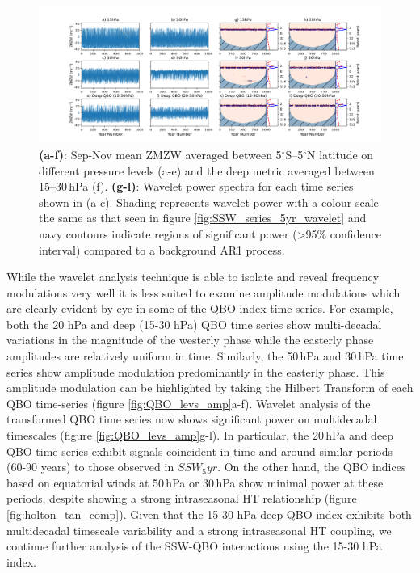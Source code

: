 \begin{center}
\begin{figure}[h!]
\noindent\includegraphics[width = \linewidth]{Figures/Figures-origins/QBO_levels.png}
\caption[QBO timeseries and associated wavelet power spectra at different levels in UKESM]{\textbf{(a-f)}: Sep-Nov mean ZMZW averaged between 5$^\circ$S--5$^\circ$N latitude on different pressure levels (a-e) and the deep metric averaged between 15--30\,hPa (f). \textbf{(g-l)}: Wavelet power spectra for each time series shown in (a-c). Shading represents wavelet power with a colour scale the same as that seen in figure \ref{fig:SSW_series_5yr_wavelet} and navy contours indicate regions of significant power (>95\% confidence interval) compared to a background AR1 process.}
\label{fig:QBO_levs}
\end{figure}
\end{center}


While the wavelet analysis technique is able to isolate and reveal frequency modulations very well it is less suited to examine amplitude modulations which are clearly evident by eye in some of the QBO index time-series. For example, both the 20 hPa and deep (15-30 hPa) QBO time series show multi-decadal variations in the magnitude of the westerly phase while the easterly phase amplitudes are relatively uniform in time. Similarly, the 50\,hPa and 30\,hPa time series show amplitude modulation predominantly in the easterly phase. This amplitude modulation can be highlighted by taking the Hilbert Transform of each QBO time-series (figure \ref{fig:QBO_levs_amp}a-f). Wavelet analysis of the transformed QBO time series now shows significant power on multidecadal timescales (figure \ref{fig:QBO_levs_amp}g-l). In particular, the 20\,hPa and deep QBO time-series exhibit signals coincident in time and around similar periods (60-90 years) to those observed in $SSW_5yr$. On the other hand, the QBO indices based on equatorial winds at 50\,hPa or 30\,hPa show minimal power at these periods, despite showing a strong intraseasonal HT relationship (figure \ref{fig:holton_tan_comp}). Given that the 15-30 hPa deep QBO  index exhibits  both multidecadal timescale variability and a strong intraseasonal HT coupling, we continue further analysis of the SSW-QBO interactions using the 15-30 hPa index. 

